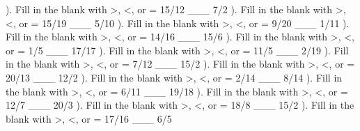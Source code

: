 \documentclass{article}%
\begin{document}
). Fill in the blank with >, <, or = 15/12 \_\_\_ 7/2%
\newline%
\newline%
). Fill in the blank with >, <, or = 15/19 \_\_\_ 5/10%
\newline%
\newline%
). Fill in the blank with >, <, or = 9/20 \_\_\_ 1/11%
\newline%
\newline%
). Fill in the blank with >, <, or = 14/16 \_\_\_ 15/6%
\newline%
\newline%
). Fill in the blank with >, <, or = 1/5 \_\_\_ 17/17%
\newline%
\newline%
). Fill in the blank with >, <, or = 11/5 \_\_\_ 2/19%
\newline%
\newline%
). Fill in the blank with >, <, or = 7/12 \_\_\_ 15/2%
\newline%
\newline%
). Fill in the blank with >, <, or = 20/13 \_\_\_ 12/2%
\newline%
\newline%
). Fill in the blank with >, <, or = 2/14 \_\_\_ 8/14%
\newline%
\newline%
). Fill in the blank with >, <, or = 6/11 \_\_\_ 19/18%
\newline%
\newline%
). Fill in the blank with >, <, or = 12/7 \_\_\_ 20/3%
\newline%
\newline%
). Fill in the blank with >, <, or = 18/8 \_\_\_ 15/2%
\newline%
\newline%
). Fill in the blank with >, <, or = 17/16 \_\_\_ 6/5%
\newline%
\end{document}
